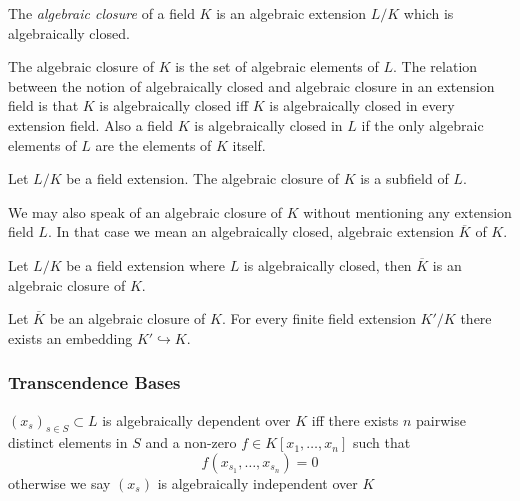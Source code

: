 \begin{definition}
   The \emph{algebraic closure} of a field \(K\) is an algebraic extension \(L/K\) which is algebraically closed.
\end{definition}
\begin{remark}[Intuition]
   The algebraic closure of \(K\) is the set of algebraic elements of \(L\).
   The relation between the notion of algebraically closed and algebraic closure in an extension field is that \(K\) is algebraically closed iff \(K\) is algebraically closed in every extension field.
   Also a field \(K\) is algebraically closed in \(L\) if the only algebraic elements of \(L\) are the elements of \(K\) itself.
\end{remark}

\begin{proposition}
   Let \(L/K\) be a field extension.
   The algebraic closure of \(K\) is a subfield of \(L\).
\end{proposition}
We may also speak of an algebraic closure of \(K\) without mentioning any extension field \(L\).
In that case we mean an algebraically closed, algebraic extension \(\overline{K}\) of \(K\).
\begin{proposition}
   Let \(L/K\) be a field extension where \(L\) is algebraically closed, then \(\overline{K}\) is an algebraic closure of \(K\).
\end{proposition}

\begin{proposition}
   Let \(\overline{K}\) be an algebraic closure of \(K\).
   For every finite field extension \(K'/K\) there exists an embedding \(K' \hookrightarrow K\).
\end{proposition}

\subsubsection{Transcendence Bases}
\begin{definition}
   \((x_s)_{s \in S} \subset L\) is algebraically dependent over \(K\) iff there exists \(n\) pairwise distinct elements in \(S\) and a non-zero \(f \in K[x_1, \ldots, x_n]\) such that
   \[f(x_{s_1}, \ldots, x_{s_n}) = 0\]
   otherwise we say \((x_s)\) is algebraically independent over \(K\)
\end{definition}

